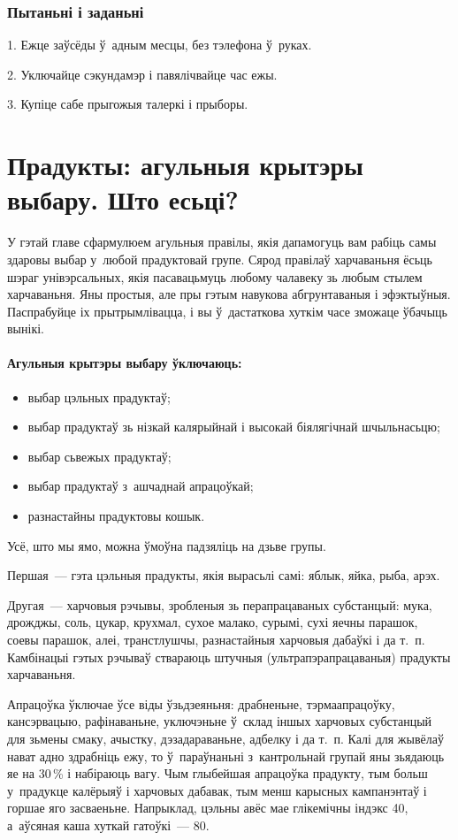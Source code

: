 \subsubsection{Пытаньні і заданьні}

1. Ежце заўсёды ў~адным месцы, без тэлефона ў~руках.

2. Уключайце сэкундамэр і павялічвайце час ежы.

3. Купіце сабе прыгожыя талеркі і прыборы.


\section{Прадукты: агульныя крытэры выбару. Што есьці?}

У гэтай главе сфармулюем агульныя правілы, якія дапамогуць вам рабіць самы здаровы выбар у~любой прадуктовай групе. Сярод правілаў харчаваньня ёсьць шэраг унівэрсальных, якія пасавацьмуць любому чалавеку зь любым стылем харчаваньня. Яны простыя, але пры гэтым навукова абгрунтаваныя і эфэктыўныя. Паспрабуйце іх прытрымлівацца, і вы ў~дастаткова хуткім часе зможаце ўбачыць вынікі.

\paragraph{Агульныя крытэры выбару ўключаюць:}
\begin{itemize}
  \item выбар цэльных прадуктаў;
  \item выбар прадуктаў зь нізкай калярыйнай і высокай біялягічнай шчыльнасьцю;
  \item выбар сьвежых прадуктаў;
  \item выбар прадуктаў з~ашчаднай апрацоўкай;
  \item разнастайны прадуктовы кошык.
\end{itemize}

Усё, што мы ямо, можна ўмоўна падзяліць на дзьве групы.

Першая~--- гэта цэльныя прадукты, якія вырасьлі самі: яблык, яйка, рыба, арэх.

Другая~--- харчовыя рэчывы, зробленыя зь перапрацаваных субстанцый: мука, дрожджы, соль, цукар, крухмал, сухое малако, сурымі, сухі яечны парашок, соевы парашок, алеі, транстлушчы, разнастайныя харчовыя дабаўкі і да т.~п. Камбінацыі гэтых рэчываў ствараюць штучныя (ультрапэрапрацаваныя) прадукты харчаваньня.

Апрацоўка ўключае ўсе віды ўзьдзеяньня: драбненьне, тэрмаапрацоўку, кансэрвацыю, рафінаваньне, уключэньне ў~склад іншых харчовых субстанцый для зьмены смаку, ачыстку, дэзадараваньне, адбелку і да т.~п. Калі для жывёлаў нават адно здрабніць ежу, то ў~параўнаньні з~кантрольнай групай яны зьядаюць яе на 30\,\% і набіраюць вагу. Чым глыбейшая апрацоўка прадукту, тым больш у~прадукце калёрыяў і харчовых дабавак, тым менш карысных кампанэнтаў і горшае яго засваеньне. Напрыклад, цэльны авёс мае глікемічны індэкс 40, а~аўсяная каша хуткай гатоўкі~--- 80.

